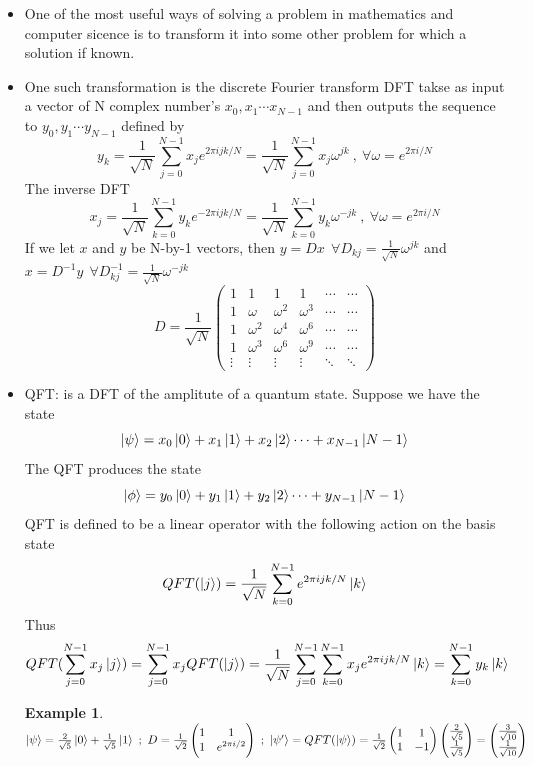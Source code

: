 \documentclass[]{article}
\newtheorem*{example}{Example}
\theoremstyle{nonumberplain}
\begin{document}
\begin{itemize}
	\item One of the most useful ways of solving a problem in mathematics and computer sicence is to transform it into some other problem for which a solution if known.
	\item One such transformation is the discrete Fourier transform DFT takse as input a vector of N complex number's $x_{0},x_{1}\cdots x_{N-1}$ and then outputs the sequence to $y_{0},y_{1}\cdots y_{N-1}$ defined by 
\[
	y_{k}=\frac{1}{\sqrt{N}} \sum^{N-1}_{j=0} x_{j}e^{2\pi i j k /N} = \frac{1}{\sqrt{N}} \sum^{N-1}_{j=0} x_{j}\omega^{jk}\ ,\ \forall \omega=e^{2\pi i /N}
\] 		
The inverse DFT
\[
	x_{j} = \frac{1}{\sqrt{N}} \sum^{N-1}_{k=0} y_{k}e^{-2\pi i j k /N}=\frac{1}{\sqrt{N}} \sum^{N-1}_{k=0} y_{k}\omega^{-jk} \ ,\ \forall \omega=e^{2\pi i /N}
\] 
If we let $x$ and $y$ be N-by-1 vectors, then $y=Dx\ \ \forall D_{kj}=\frac{1}{\sqrt{N}}\omega^{jk}$ and $x=D^{-1}y\ \ \forall D^{-1}_{kj}=\frac{1}{\sqrt{N}}\omega^{-jk}$
\[
	D = \frac{1}{\sqrt{N}}\begin{pmatrix} 1&1&1&1&\cdots&\cdots \\  1&\omega&\omega^{2}&\omega^{3}&\cdots&\cdots\\  1&\omega^{2}&\omega^{4}&\omega^{6}&\cdots&\cdots\\  1&\omega^{3}&\omega^{6}&\omega^{9}&\cdots&\cdots\\ \vdots & \vdots & \vdots & \vdots &\ddots & \ddots \end{pmatrix} 
\] 
\item QFT: is a DFT of the amplitute of a quantum state. Suppose we have the state
\[
\ket{\psi}=x_{0}\ket{0}+x_{1}\ket{1}+x_{2}\ket{2}\cdots + x_{N-1}\ket{N-1}
\] 
The QFT produces the state
\[
\ket{\phi}=y_{0}\ket{0}+y_{1}\ket{1}+y_{2}\ket{2}\cdots + y_{N-1}\ket{N-1}
\] 
QFT is defined to be a linear operator with the following action on the basis state 
\[
	QFT(\ket{j}) = \frac{1}{\sqrt{N}} \sum^{N-1}_{k=0} e^{2\pi i j k /N}\ket{k}
\]
Thus
\[
	QFT( \sum^{N-1}_{j=0} x_{j}\ket{j}) = \sum^{N-1}_{j=0} x_{j}QFT(\ket{j}) = \frac{1}{\sqrt{N}}\sum^{N-1}_{j=0} \sum^{N-1}_{k=0} x_{j}e^{2\pi ij k/N}\ket{k} = \sum^{N-1}_{k=0} y_{k} \ket{k}
\]
\begin{example} \ \\
	$\ket{\psi}=\frac{2}{\sqrt{5}}\ket{0}+\frac{1}{\sqrt{5}}\ket{1}\ ;\ D = \frac{1}{\sqrt{2}}\begin{pmatrix} 1&1\\1&e^{2\pi i/2} \end{pmatrix} \ ;\ \ket{\psi'}=QFT(\ket{\psi})= \frac{1}{\sqrt{2}} \begin{pmatrix} 1&1\\1&-1 \end{pmatrix} \begin{pmatrix} \frac{2}{\sqrt{5}}\\ \frac{1}{\sqrt{5}} \end{pmatrix}=\begin{pmatrix} \frac{3}{\sqrt{10}}\\ \frac{1}{\sqrt{10}} \end{pmatrix}  $

\end{example}
\end{itemize}
\end{document}
